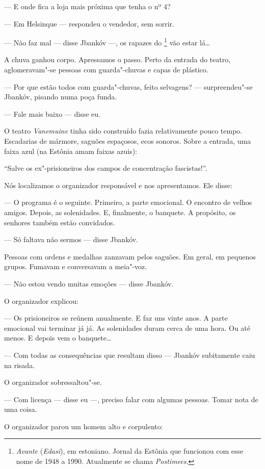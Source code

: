 --- E onde fica a loja mais próxima que tenha o nº 4?

--- Em Helsinque --- respondeu o vendedor, sem sorrir.

--- Não faz mal --- disse Jbankóv ---, os rapazes do
\emph{}\footnote{\emph{Avante} (\emph{Edasi}), em estoniano.
  Jornal da Estônia que funcionou com esse nome de 1948 a 1990.
  Atualmente se chama \emph{Postimees}.} vão estar lá\ldots{}

A chuva ganhou corpo. Apressamos o passo. Perto da entrada do teatro,
aglomeravam"-se pessoas com guarda"-chuvas e capas de plástico.

--- Por que estão todos com guarda"-chuvas, feito selvagens? ---
surpreendeu"-se Jbankóv, pisando numa poça funda.

--- Fale mais baixo --- disse eu.

O teatro \emph{Vanemuine} tinha sido construído fazia relativamente
pouco tempo. Escadarias de mármore, saguões espaçosos, ecos sonoros.
Sobre a entrada, uma faixa azul (na Estônia amam faixas azuis):

``Salve os ex"-prisioneiros dos campos de concentração fascistas!''.

Nós localizamos o organizador responsável e nos apresentamos. Ele disse:

--- O programa é o seguinte. Primeiro, a parte emocional. O encontro de
velhos amigos. Depois, as solenidades. E, finalmente, o banquete. A
propósito, os senhores também estão convidados.

--- Só faltava não sermos --- disse Jbankóv.

Pessoas com ordens e medalhas zanzavam pelos saguões. Em geral, em
pequenos grupos. Fumavam e conversavam a meia"-voz.

--- Não estou vendo muitas emoções --- disse Jbankóv.

O organizador explicou:

--- Os prisioneiros se reúnem anualmente. E faz uns vinte anos. A parte
emocional vai terminar já já. As solenidades duram cerca de uma hora. Ou
até menos. E depois vem o banquete\ldots{}

--- Com todas as consequências que resultam disso --- Jbankóv
subitamente caiu na risada.

O organizador sobressaltou"-se.

--- Com licença --- disse eu ---, preciso falar com algumas pessoas.
Tomar nota de uma coisa.

O organizador parou um homem alto e corpulento:

